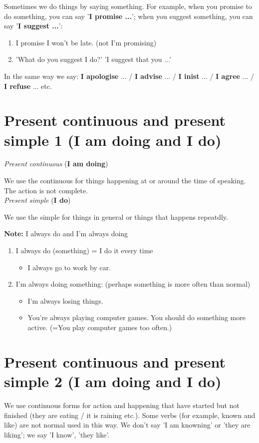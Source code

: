 \documentclass[12pt]{article}
\begin{document}
    Sometimes we do things by saying something. For example, when you promise to do something, 
    you can say '\textbf{I promise ...}'; when you suggest something, you can say '\textbf{I suggest ...}':
    \begin{enumerate}
        \item I promise I won't be late. (not I'm promising)
        \item 'What do you suggest I do?' 'I suggest that you ...'
    \end{enumerate}
    In the same way we say: \textbf{I apologise} ... / \textbf{I advise} ... / \textbf{I inist} ... / \textbf{I agree} ... /
    \textbf{I refuse} ... etc.

    \section{Present continuous and present simple 1 (I am doing and I do)}
    \textit{Present continuous} (\textbf{I am doing}) 

    We use the continuous for things happening at or around the time of speaking. The action is not complete.\\

    \textit{Present simple} (\textbf{I do})

    We use the simple for things in general or things that happens repeatdly.

    \textbf{Note:} I always do and I'm always doing

    \begin{enumerate}
        \item I always do (something) = I do it every time
        \begin{itemize}
            \item I always go to work by car.
        \end{itemize}
        \item I'm always doing something: (perhaps something is more often than normal)
        \begin{itemize}
            \item I'm always losing things.
            \item You're always playing computer games. You should do something more active. (=You play computer games too often.)
        \end{itemize}
    \end{enumerate}

    \section{Present continuous and present simple 2 (I am doing and I do)}
    We use continuous forms for action and happening that have started but not finished (they are eating / it is raining etc.). Some
    verbs (for example, known and like) are not normal used in this way. We don't say 'I am knowning' or 'they are liking'; we say 'I know', 'they like'.
\end{document}
